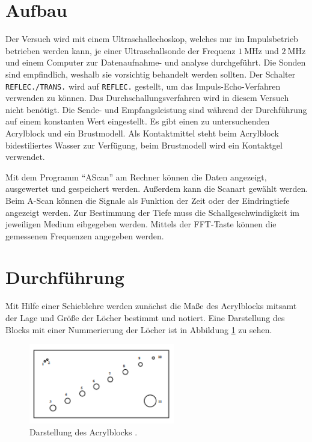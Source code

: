 \section{Aufbau}
Der Versuch wird mit einem Ultraschallechoskop, welches nur im Impulsbetrieb betrieben werden kann, 
je einer Ultraschallsonde der Frequenz $\qty[]{1}{\mega\hertz}$ und $\qty[]{2}{\mega\hertz}$
und einem Computer zur Datenaufnahme- und analyse durchgeführt.
Die Sonden sind empfindlich, weshalb sie vorsichtig behandelt werden sollten.
Der Schalter \texttt{REFLEC./TRANS.} wird auf \texttt{REFLEC.} gestellt, um das Impuls-Echo-Verfahren verwenden zu können.
Das Durchschallungsverfahren wird in diesem Versuch nicht benötigt.
Die Sende- und Empfangsleistung sind während der Durchführung auf einem konstanten Wert eingestellt.
Es gibt einen zu untersuchenden Acrylblock und ein Brustmodell.
Als Kontaktmittel steht beim Acrylblock bidestiliertes Wasser zur Verfügung, beim Brustmodell wird ein Kontaktgel verwendet.



\noindent
Mit dem Programm \enquote{AScan} am Rechner können die Daten angezeigt, ausgewertet und gespeichert werden.
Außerdem kann die Scanart gewählt werden.
Beim A-Scan können die Signale als Funktion der Zeit oder der Eindringtiefe angezeigt werden.
Zur Bestimmung der Tiefe muss die Schallgeschwindigkeit im jeweiligen Medium eibgegeben werden.
Mittels der FFT-Taste können die gemessenen Frequenzen angegeben werden.




\section{Durchführung}
Mit Hilfe einer Schieblehre werden zunächst die Maße des Acrylblocks mitsamt der Lage und Größe der Löcher bestimmt und notiert.
Eine Darstellung des Blocks mit einer Nummerierung der Löcher ist in Abbildung \ref{fig:acrylblock} zu sehen.

\begin{figure}[H]
    \centering
    \includegraphics*[height=3.5cm]{Abbildungen/acrylblock.png}
    \caption{Darstellung des Acrylblocks \cite[]{man:us1}.}
    \label{fig:acrylblock}
\end{figure}

